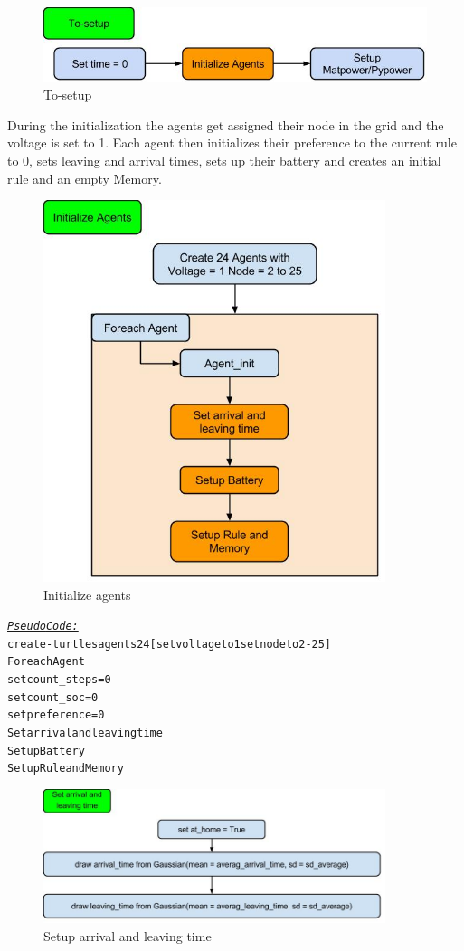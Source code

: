 \documentclass[a4paper]{article}
\begin{document}
\begin{figure}[!ht]
\includegraphics[width =\textwidth ]{setup.jpg}
\caption{To-setup}
\label{setup}
\end{figure}
During the initialization the agents get assigned their node in the grid and the voltage is set to 
1. Each agent then initializes their preference to the current rule to 0, sets leaving and arrival times, 
sets up their battery and creates an initial rule and an empty Memory.
\begin{figure}[!ht]
\includegraphics[width = 10cm]{init_agent.jpg}
\caption{Initialize agents}
\label{init_agents}
\end{figure}
\begin{alltt}
 \underline{\textit{Pseudo Code:}}
create-turtles agents 24 [set voltage to 1 set node to 2-25]
Foreach Agent
    set count_steps = 0 
    set count_soc = 0 
    set preference = 0
    Set arrival and leaving time
    Setup Battery
    Setup Rule and Memory
\end{alltt}

\begin{figure}[!ht]
\centering
\includegraphics[width =10cm]{set_arrival_leaving_time.jpg}
\caption{Setup arrival and leaving time}
\label{setup_arival_leaving}
\end{figure}
\end{document}
